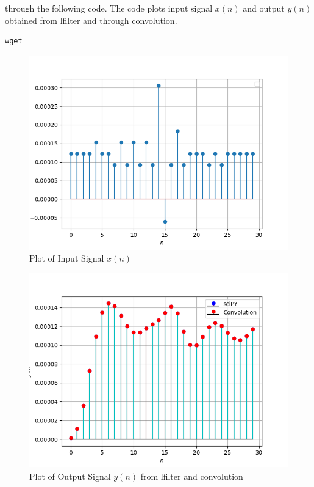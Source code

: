 \documentclass[journal,12pt,twocolumn]{IEEEtran}
\theoremstyle{remark}
\renewcommand\thesection{\arabic{section}}
\numberwithin{equation}{subsection}
\begin{document}
\begin{enumerate}[label=\thesection.\arabic*]
through the following code. The code plots input signal $x(n)$ and output $y(n)$ obtained from lfilter and through convolution.
\begin{lstlisting}
wget 
\end{lstlisting}
\begin{figure}[!h]
    \centering
    \includegraphics[width = \columnwidth]{figs/input.png}
    \caption{Plot of Input Signal $x(n)$}
    \label{fig:input}
\end{figure}
\begin{figure}[!h]
    \centering
    \includegraphics[width = \columnwidth]{figs/output.png}
    \caption{Plot of Output Signal $y(n)$ from lfilter and convolution}
    \label{fig:output}
\end{figure}

\end{enumerate}
\end{document}
